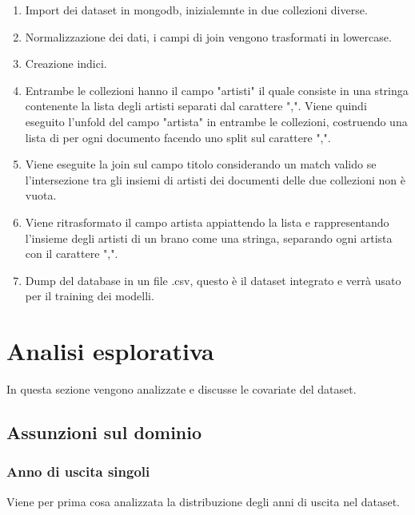 \begin{enumerate}
	\item Import dei dataset in mongodb, inizialemnte in due collezioni diverse.
	\item Normalizzazione dei dati, i campi di join vengono trasformati in lowercase.
	\item Creazione indici.
	\item Entrambe le collezioni hanno il campo "artisti" il quale consiste in una stringa contenente la lista degli artisti separati dal carattere ",". Viene quindi eseguito l'unfold del campo "artista" in entrambe le collezioni, costruendo una lista di per ogni documento facendo uno split sul carattere ",".
	\item Viene eseguite la join sul campo titolo considerando un match valido se l'intersezione tra gli insiemi di artisti dei documenti delle due collezioni non è vuota.
	\item Viene ritrasformato il campo artista appiattendo la lista e rappresentando l'insieme degli artisti di un brano come una stringa, separando ogni artista con il carattere ",".
	\item Dump del database in un file .csv, questo è il dataset integrato e verrà usato per il training dei modelli.
\end{enumerate}



\section{Analisi esplorativa}
In questa sezione vengono analizzate e discusse le covariate del dataset.
\subsection{Assunzioni sul dominio}
\subsubsection{Anno di uscita singoli}
Viene per prima cosa analizzata la distribuzione degli anni di uscita nel dataset.

